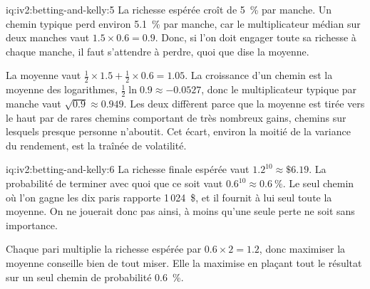 \begin{solution}{iq:iv2:betting-and-kelly:5}
La richesse espérée croît de 5~\% par manche. Un chemin typique perd environ 5.1~\% par manche, car le multiplicateur médian sur deux manches vaut $1.5 \times 0.6 = 0.9$. Donc, si l'on doit engager toute sa richesse à chaque manche, il faut s'attendre à perdre, quoi que dise la moyenne.

La moyenne vaut $\tfrac12 \times 1.5 + \tfrac12 \times 0.6 = 1.05$. La croissance d'un chemin est la moyenne des logarithmes, $\tfrac12 \ln 0.9 \approx -0.0527$, donc le multiplicateur typique par manche vaut $\sqrt{0.9} \approx 0.949$. Les deux diffèrent parce que la moyenne est tirée vers le haut par de rares chemins comportant de très nombreux gains, chemins sur lesquels presque personne n'aboutit. Cet écart, environ la moitié de la variance du rendement, est la traînée de volatilité.

\end{solution}

\begin{solution}{iq:iv2:betting-and-kelly:6}
La richesse finale espérée vaut $1.2^{10} \approx \$6.19$. La probabilité de terminer avec quoi que ce soit vaut $0.6^{10} \approx 0.6~\%$. Le seul chemin où l'on gagne les dix paris rapporte 1\,024~\$, et il fournit à lui seul toute la moyenne. On ne jouerait donc pas ainsi, à moins qu'une seule perte ne soit sans importance.

Chaque pari multiplie la richesse espérée par $0.6 \times 2 = 1.2$, donc maximiser la moyenne conseille bien de tout miser. Elle la maximise en plaçant tout le résultat sur un seul chemin de probabilité 0.6~\%.

\end{solution}

